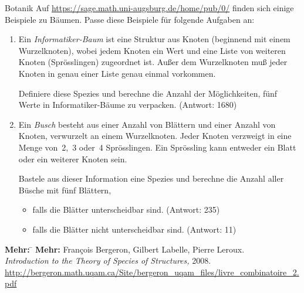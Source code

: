 \documentclass{pizzablatt}
\begin{document}
\begin{aufgabe}{Botanik}
Auf \url{https://sage.math.uni-augsburg.de/home/pub/0/} finden sich einige
Beispiele zu Bäumen. Passe diese Beispiele für folgende Aufgaben an:
\begin{enumerate}
\item Ein \emph{Informatiker-Baum} ist eine Struktur aus Knoten (beginnend
mit einem Wurzelknoten), wobei jedem Knoten ein Wert und eine Liste von
weiteren Knoten (Sprösslingen) zugeordnet ist. Außer dem Wurzelknoten muß jeder Knoten in genau einer Liste genau einmal vorkommen.

Definiere diese Spezies und berechne die Anzahl der Möglichkeiten, fünf Werte in Informatiker-Bäume zu verpacken. (Antwort: 1680)
\item Ein \emph{Busch} besteht aus einer Anzahl von Blättern und einer Anzahl
von Knoten, verwurzelt an einem Wurzelknoten. Jeder Knoten verzweigt in eine
Menge von~2,~3 oder~4 Sprösslingen. Ein Sprössling kann entweder ein Blatt oder
ein weiterer Knoten sein.

Bastele aus dieser Information eine Spezies und
berechne die Anzahl aller Büsche mit fünf Blättern,
\begin{itemize}
\item falls die Blätter unterscheidbar sind. (Antwort: 235)
\item falls die Blätter nicht unterscheidbar sind. (Antwort: 11)
\end{itemize}
\end{enumerate}
\end{aufgabe}

\begin{tabbing}
  \textbf{Mehr:} \= \kill
  \textbf{Mehr:} \>
  François Bergeron, Gilbert Labelle, Pierre Leroux. \\
  \> \emph{Introduction to the Theory of Species of Structures,} 2008.\\
  \> \small
  \url{http://bergeron.math.uqam.ca/Site/bergeron_uqam_files/livre_combinatoire_2.pdf}
\end{tabbing}
\end{document}
